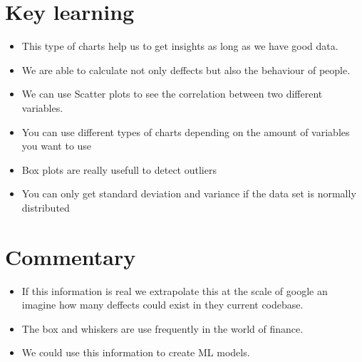 \section{Key learning}
\begin{itemize}
    \item This type of charts help us to get insights as long as we have good data.
    \item We are able to calculate not only deffects but also the behaviour of people.
    \item We can use Scatter plots to see the correlation between two different variables.
    \item You can use different types of charts depending on the amount of variables you want to use 
    \item Box plots are really usefull to detect outliers
    \item You can only get standard deviation and variance if the data set is normally distributed
\end{itemize}

\pagebreak

\section{Commentary}
\begin{itemize}
    \item If this information is real we extrapolate this at the scale of google an imagine how many deffects could exist in they current codebase.
    \item The box and whiskers are use frequently in the world of finance.
    \item We could use this information to create ML models.
\end{itemize}

